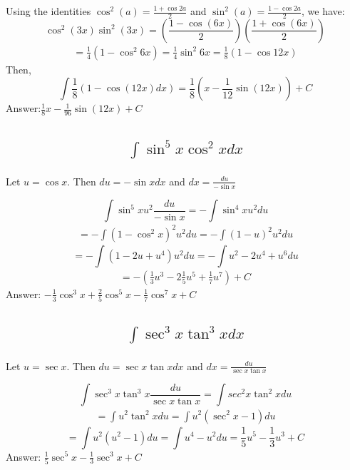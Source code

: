 \documentclass{article}
\begin{document}
   Using the identities $\cos ^2 (a) = \frac{1 + \cos 2a}{2}$ and $\sin ^2 (a) = \frac{1 - \cos 2a}{2}$, we have:
   \[  \cos^2(3x) \sin^2(3x) = \left( \frac{1 - \cos(6x)}{2} \right) \left( \frac{1 + \cos(6x)}{2} \right)  \]
   \begin{align*}
   	= \frac{1}{4} \left(1- \cos ^2 6x \right)  = \frac{1}{4} \sin^2 6x = \frac{1}{8} \left(1-\cos 12x \right)
   \end{align*}
   Then,
\[ \int {\frac{1}{8} \left( 1-\cos (12x) dx \right) } = \frac{1}{8} (x - \frac{1}{12} \sin{(12x)}) +C \]
Answer:$ \frac{1}{8}x - \frac{1}{96} \sin{(12x)} +C $

\subsection{
	\begin{align*}
		\int{\sin^5{x} \cos^2{x} dx}
	\end{align*}
}

Let $u = \cos{x}$. Then $du = -\sin{x} dx$ and $dx = \frac{du}{-\sin{x}}$

\[ \int{\sin^5{x} u^2 \frac{du}{-\sin{x}}} = - \int{\sin^4{x} u ^2 du} \]
\begin{align*}
	= - \int{(1- \cos^2{x})^2 u^2 du} = - \int{(1- u)^2 u^2 du} 
\end{align*}
\[= - \int{(1-2u+u^4) u^2 du} = -\int{u^2 -2u^4+u^6 du} \]
\begin{align*}
	= -(\frac{1}{3} u^3 - 2\frac{1}{5} u^5+\frac{1}{7} u^7) +C
\end{align*}
Answer: $-\frac{1}{3} \cos^3{x} + \frac{2}{5} \cos^5{x} - \frac{1}{7} \cos^7{x} +C$
\subsection{
	\begin{align*}
		\int{\sec^3{x} \tan^3{x} dx}
	\end{align*}
}

Let $u = \sec{x}$. Then $du = \sec{x}\tan{x}dx $ and $dx = \frac{du}{\sec{x}\tan{x}}$

\[\int{\sec^3{x}\tan^3{x} \frac{du}{\sec{x}\tan{x}}} = \int{sec^2{x}\tan^2{x} du}\]
\begin{align*}
	 = \int{u^2 \tan^2{x} du} = \int{u^2 (\sec^2{x} - 1) du} 
\end{align*}
\[= \int{u^2 (u^2 - 1) du} = \int{u^4 - u^2 du} = \frac{1}{5}u^5 - \frac{1}{3}u^3 +C\]
Answer: $ \frac{1}{5}\sec^5{x} - \frac{1}{3}\sec^3{x} +C$
\end{document}
